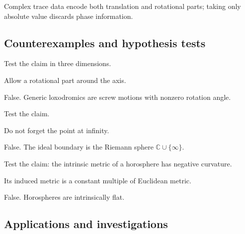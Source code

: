 \begin{solution}
Complex trace data encode both translation and rotational parts; taking only absolute value discards phase information.
\end{solution}

\subsection*{Counterexamples and hypothesis tests}

\begin{exercise}\label{exr:vii36-ped-10}
Test the claim in three dimensions.
\end{exercise}

\begin{hint}
Allow a rotational part around the axis.
\end{hint}

\begin{solution}
False.  Generic loxodromics are screw motions with nonzero rotation angle.
\end{solution}

\begin{exercise}\label{exr:vii36-ped-11}
Test the claim.
\end{exercise}

\begin{hint}
Do not forget the point at infinity.
\end{hint}

\begin{solution}
False.  The ideal boundary is the Riemann sphere \(\mathbb C\cup\{\infty\}\).
\end{solution}

\begin{exercise}\label{exr:vii36-ped-12}
Test the claim: the intrinsic metric of a horosphere has negative curvature.
\end{exercise}

\begin{hint}
Its induced metric is a constant multiple of Euclidean metric.
\end{hint}

\begin{solution}
False.  Horospheres are intrinsically flat.
\end{solution}

\subsection*{Applications and investigations}

